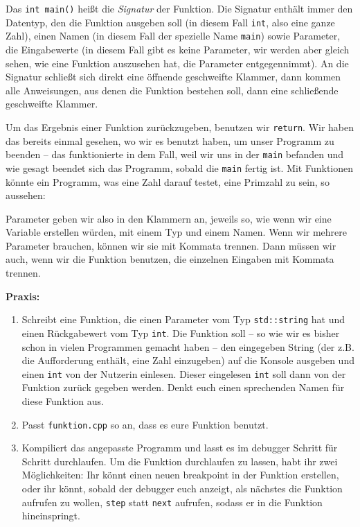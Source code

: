 Das \texttt{int main()} heißt die \emph{Signatur} der Funktion. Die Signatur
enthält immer den Datentyp, den die Funktion ausgeben soll (in diesem Fall
\texttt{int}, also eine ganze Zahl), einen Namen (in diesem Fall der spezielle
Name \texttt{main}) sowie Parameter, die Eingabewerte (in diesem Fall gibt es
keine Parameter, wir werden aber gleich sehen, wie eine Funktion auszusehen
hat, die Parameter entgegennimmt). An die Signatur schließt sich direkt eine
öffnende geschweifte Klammer, dann kommen alle Anweisungen, aus denen die
Funktion bestehen soll, dann eine schließende geschweifte Klammer.

Um das Ergebnis einer Funktion zurückzugeben, benutzen wir \texttt{return}. Wir
haben das bereits einmal gesehen, wo wir es benutzt haben, um unser Programm zu
beenden -- das funktionierte in dem Fall, weil wir uns in der \texttt{main}
befanden und wie gesagt beendet sich das Programm, sobald die \texttt{main}
fertig ist. Mit Funktionen könnte ein Programm, was eine Zahl darauf testet,
eine Primzahl zu sein, so aussehen:

Parameter geben wir also in den Klammern an, jeweils so, wie wenn wir eine
Variable erstellen würden, mit einem Typ und einem Namen. Wenn wir mehrere
Parameter brauchen, können wir sie mit Kommata trennen. Dann müssen wir auch,
wenn wir die Funktion benutzen, die einzelnen Eingaben mit Kommata trennen.

\textbf{Praxis:}
\begin{enumerate}
    \item Schreibt eine Funktion, die einen Parameter vom Typ
        \texttt{std::string} hat und einen Rückgabewert vom Typ \texttt{int}.
        Die Funktion soll -- so wie wir es bisher schon in vielen Programmen
        gemacht haben -- den eingegeben String (der z.B. die Aufforderung
        enthält, eine Zahl einzugeben) auf die Konsole ausgeben und einen
        \texttt{int} von der Nutzerin einlesen. Dieser eingelesen \texttt{int}
        soll dann von der Funktion zurück gegeben werden.
        Denkt euch einen sprechenden Namen für diese Funktion aus.
    \item Passt \texttt{funktion.cpp} so an, dass es eure Funktion benutzt.
    \item Kompiliert das angepasste Programm und lasst es im debugger Schritt
        für Schritt durchlaufen. Um die Funktion durchlaufen zu lassen, habt
        ihr zwei Möglichkeiten: Ihr könnt einen neuen breakpoint in der
        Funktion erstellen, oder ihr könnt, sobald der debugger euch anzeigt,
        als nächstes die Funktion aufrufen zu wollen, \texttt{step} statt
        \texttt{next} aufrufen, sodass er in die Funktion hineinspringt.
\end{enumerate}

